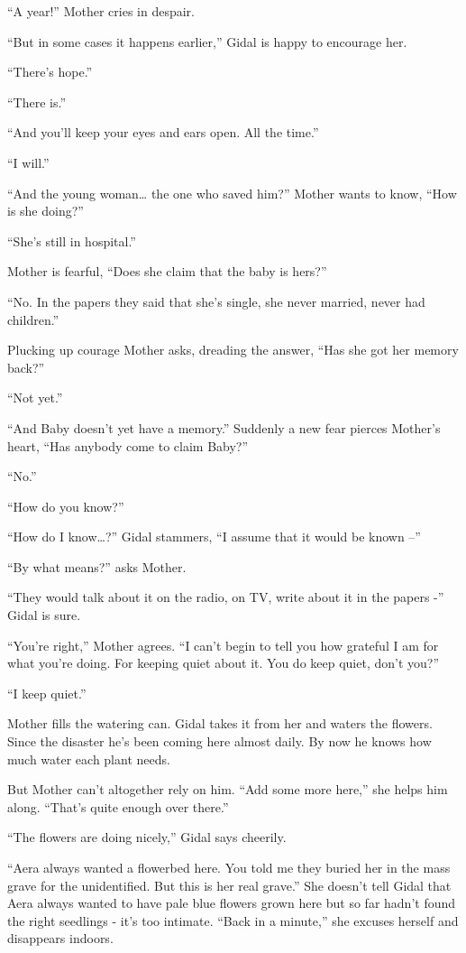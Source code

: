 \documentclass[twoside,11pt]{book}
\begin{document}
``A year!'' Mother cries in despair.

``But in some cases it happens earlier,'' Gidal is happy to encourage her.

``There's hope.''

``There is.''

``And you'll keep your eyes and ears open. All the time.''

``I will.''

``And the young woman{\dots} the one who saved him?'' Mother wants to know, ``How
is she doing?''

``She's still in hospital.''

Mother is fearful, ``Does she claim{ }that the baby is hers?''

``No. In the papers they said that she's single, she never married, never had children.''

Plucking up courage Mother asks, dreading the answer, ``Has she got her memory back?''

``Not yet.''

``And Baby doesn't yet have a memory.'' Suddenly a new fear pierces Mother's heart,
``Has anybody come to claim Baby?''

``No.''

``How do you know?''

``How do I know{\dots}?'' Gidal stammers, ``I assume that it would be known
--''

``By what means?'' asks Mother.

``They would talk about it on the radio, on TV, write about it in the papers -'' Gidal is
sure.

``You're right,'' Mother agrees. ``I can't begin to tell you how grateful I am
for what you're doing. For keeping quiet about it. You do keep quiet, don't you?''

``I keep quiet.''

Mother fills the watering can.  Gidal takes it from her and waters the flowers. Since the disaster he's been coming here
almost daily. By now he knows how much water each plant needs.

But Mother can't altogether rely on him. ``Add some more here,'' she helps him along.
``That's quite enough over there.''

``The flowers are doing nicely,'' Gidal says cheerily.

``Aera  always wanted a flowerbed here. You told me they buried her in the mass grave for the unidentified.
But this is her real grave.'' She doesn't tell Gidal that Aera always wanted to have pale blue flowers
grown here but so far hadn't found the right seedlings - it's too intimate. ``Back in a
minute,'' she excuses herself and disappears indoors.
\end{document}
